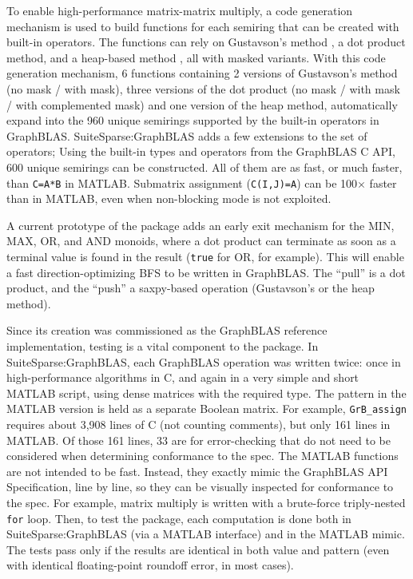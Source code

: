 To enable high-performance matrix-matrix multiply, a code generation mechanism
is used to build functions for each semiring that can be created with built-in
operators.  The functions can rely on Gustavson's method \cite{Gustavson78}, a
dot product method, and a heap-based method \cite{sisc3dspgemm}, all with
masked variants.  With this code generation mechanism, 6 functions
containing 2 versions of Gustavson's method (no mask / with mask),
three versions of the dot product (no mask / with mask / with complemented
mask) and one version of the heap method, automatically expand into the 960
unique semirings supported by the built-in operators in GraphBLAS.
SuiteSparse:GraphBLAS adds a few extensions to the set of operators;
Using the  built-in types and operators from the GraphBLAS C API,
600 unique semirings can be constructed.  All of them are as fast, or much
faster, than \verb'C=A*B' in MATLAB.  Submatrix assignment (\verb'C(I,J)=A')
can be 100$\times$ faster than in MATLAB, even when non-blocking mode is not exploited.

A current prototype of the package adds an early exit
mechanism for the MIN, MAX, OR, and AND monoids, where a dot product can
terminate as soon as a terminal value is found in the result (\verb'true' for
OR, for example).  This will enable a fast direction-optimizing BFS
\cite{Beamer:2012:DOB} to be written in GraphBLAS.  The ``pull'' is a dot
product, and the ``push'' a saxpy-based operation (Gustavson's or the heap
method).

Since its creation was commissioned as the GraphBLAS reference implementation,
testing is a vital component to the package.  In SuiteSparse:GraphBLAS, each
GraphBLAS operation was written twice: once in high-performance algorithms in
C, and again in a very simple and short MATLAB script, using dense matrices
with the required type.  The pattern in the MATLAB version is held as a
separate Boolean matrix.  For example, \verb'GrB_assign' requires about 3,908
lines of C (not counting comments), but only 161 lines in MATLAB. Of those 161
lines, 33 are for error-checking that do not need to be considered when
determining conformance to the spec.  The MATLAB functions are not intended to
be fast.  Instead, they exactly mimic the GraphBLAS API Specification, line by
line, so they can be visually inspected for conformance to the spec.  For
example, matrix multiply is written with a brute-force triply-nested \verb'for'
loop.  Then, to test the package, each computation is done both in
SuiteSparse:GraphBLAS (via a MATLAB interface) and in the MATLAB mimic.  The
tests pass only if the results are identical in both value and pattern (even
with identical floating-point roundoff error, in most cases).

